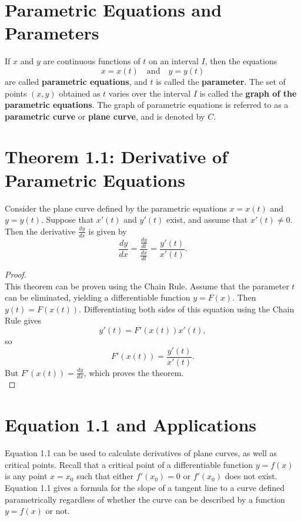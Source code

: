 \documentclass{article}
\begin{document}
\renewcommand{\familydefault}{\rmdefault}


\normalsize


\section*{Parametric Equations and Parameters}

\begin{definitionbox}
If \( x \) and \( y \) are continuous functions of \( t \) on an interval \( I \), then the equations  
\[
x = x(t) \quad \text{and} \quad y = y(t)
\]  
are called \textbf{parametric equations}, and \( t \) is called the \textbf{parameter}. The set of points \( (x, y) \) obtained as \( t \) varies over the interval \( I \) is called the \textbf{graph of the parametric equations}. The graph of parametric equations is referred to as a \textbf{parametric curve} or \textbf{plane curve}, and is denoted by \( C \).  
\end{definitionbox}

\section*{Theorem 1.1: Derivative of Parametric Equations}
\begin{theorembox}
Consider the plane curve defined by the parametric equations \( x = x(t) \) and \( y = y(t) \). Suppose that \( x'(t) \) and \( y'(t) \) exist, and assume that \( x'(t) \neq 0 \). Then the derivative \( \frac{dy}{dx} \) is given by  
\[
\frac{dy}{dx} = \frac{\frac{dy}{dt}}{\frac{dx}{dt}} = \frac{y'(t)}{x'(t)}.
\]
\begin{proofbox}
    \begin{proof}
    \leavevmode\\
        This theorem can be proven using the Chain Rule. Assume that the parameter \( t \) can be eliminated, yielding a differentiable function \( y = F(x) \). Then \( y(t) = F(x(t)) \). Differentiating both sides of this equation using the Chain Rule gives  
        \[
        y'(t) = F'(x(t)) x'(t),
        \]  
        so  
        \[
        F'(x(t)) = \frac{y'(t)}{x'(t)}.
        \]  
        But \( F'(x(t)) = \frac{dy}{dx} \), which proves the theorem. \\
    \end{proof}
    \end{proofbox}
\end{theorembox}

\section*{Equation 1.1 and Applications}
\begin{notebox}
Equation 1.1 can be used to calculate derivatives of plane curves, as well as critical points. Recall that a critical point of a differentiable function \( y = f(x) \) is any point \( x = x_0 \) such that either \( f'(x_0) = 0 \) or \( f'(x_0) \) does not exist. Equation 1.1 gives a formula for the slope of a tangent line to a curve defined parametrically regardless of whether the curve can be described by a function \( y = f(x) \) or not.
\end{notebox}
\end{document}
